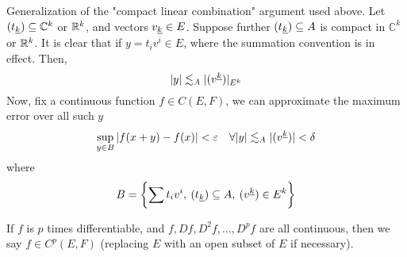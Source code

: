 \documentclass[../main-v2-manifolds.tex]{subfiles}
\begin{document}
\begin{remark}\label{rmk:compact-linear-combination}
    Generalization of the "compact linear combination" argument used above. Let $(\UL{t}[k])\subseteq\mathbb{C}^k$ or $\mathbb{R}^k$, and vectors $\UL{v}[k]\in E$. Suppose further $(\UL{t}[k])\subseteq A$ is compact in $\mathbb{C}^k$ or ${\mathbb{R}^k}$. It is clear that if $y = t_iv^i\in E$, where the summation convention is in effect. Then,
    \[
        \vert {y} \vert\lesssim_A \vert {(v^{\underline{k}})} \vert_{E^k}
    \]
    Now, fix a continuous function $f\in C(E,F)$, we can approximate the maximum error over all such $y$
    \[
        \sup_{y\in B}\vert {f(x+y) - f(x)} \vert< \varepsilon\quad\forall \vert {y} \vert\lesssim_A\vert(v^{\underline{k}})\vert < \delta
    \]
    where
    \[
    B = \bigset{\sum t_iv^i,\: (\UL{t}[k])\subseteq A,\: (v^{\underline{k}})\in E^k }
    \]
\end{remark}

If $f$ is $p$ times differentiable, and $f, Df, D^2f, \ldots, D^pf$ are all continuous, then we say $f\in C^p(E,F)$ (replacing $E$ with an open subset of $E$ if necessary). 
\end{document}
